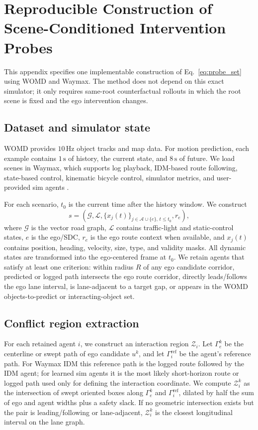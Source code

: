 \documentclass[10pt]{article}
\newcommand{\cA}{\mathcal{A}}
\newcommand{\cG}{\mathcal{G}}
\newcommand{\cL}{\mathcal{L}}
\newcommand{\cZ}{\mathcal{Z}}
\begin{document}
\appendix

\section{Reproducible Construction of Scene-Conditioned Intervention Probes}
\label{app:probe_construction}

This appendix specifies one implementable construction of Eq.~\eqref{eq:probe_set} using WOMD and Waymax. The method does not depend on this exact simulator; it only requires same-root counterfactual rollouts in which the root scene is fixed and the ego intervention changes.

\subsection{Dataset and simulator state}
\label{app:womd_waymax_state}

WOMD provides \(10\,\mathrm{Hz}\) object tracks and map data. For motion prediction, each example contains \(1\,\mathrm{s}\) of history, the current state, and \(8\,\mathrm{s}\) of future. We load scenes in Waymax, which supports log playback, IDM-based route following, state-based control, kinematic bicycle control, simulator metrics, and user-provided sim agents \parencite{ettinger2021large,gulino2023waymax}.

For each scenario, \(t_0\) is the current time after the history window. We construct
\[
s=\left(\cG,\cL,\{x_j(t)\}_{j\in\cA\cup\{e\},\,t\le t_0},r_e\right),
\]
where \(\cG\) is the vector road graph, \(\cL\) contains traffic-light and static-control states, \(e\) is the ego/SDC, \(r_e\) is the ego route context when available, and \(x_j(t)\) contains position, heading, velocity, size, type, and validity masks. All dynamic states are transformed into the ego-centered frame at \(t_0\). We retain agents that satisfy at least one criterion: within radius \(R\) of any ego candidate corridor, predicted or logged path intersects the ego route corridor, directly leads/follows the ego lane interval, is lane-adjacent to a target gap, or appears in the WOMD objects-to-predict or interacting-object set.

\subsection{Conflict region extraction}
\label{app:conflict_region}

For each retained agent \(i\), we construct an interaction region \(\cZ_i\). Let \(\Gamma_e^k\) be the centerline or swept path of ego candidate \(u^k\), and let \(\Gamma_i^{\mathrm{ref}}\) be the agent's reference path. For Waymax IDM this reference path is the logged route followed by the IDM agent; for learned sim agents it is the most likely short-horizon route or logged path used only for defining the interaction coordinate. We compute \(\cZ_i^k\) as the intersection of swept oriented boxes along \(\Gamma_e^k\) and \(\Gamma_i^{\mathrm{ref}}\), dilated by half the sum of ego and agent widths plus a safety slack. If no geometric intersection exists but the pair is leading/following or lane-adjacent, \(\cZ_i^k\) is the closest longitudinal interval on the lane graph.
\end{document}
